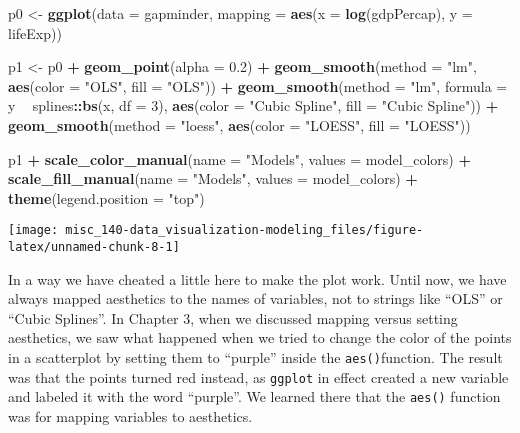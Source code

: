 \documentclass[]{book}
\newenvironment{Shaded}{\begin{snugshade}}{\end{snugshade}}
\newcommand{\DataTypeTok}[1]{\textcolor[rgb]{0.13,0.29,0.53}{#1}}
\newcommand{\DecValTok}[1]{\textcolor[rgb]{0.00,0.00,0.81}{#1}}
\newcommand{\FloatTok}[1]{\textcolor[rgb]{0.00,0.00,0.81}{#1}}
\newcommand{\KeywordTok}[1]{\textcolor[rgb]{0.13,0.29,0.53}{\textbf{#1}}}
\newcommand{\NormalTok}[1]{#1}
\newcommand{\OperatorTok}[1]{\textcolor[rgb]{0.81,0.36,0.00}{\textbf{#1}}}
\newcommand{\StringTok}[1]{\textcolor[rgb]{0.31,0.60,0.02}{#1}}
\begin{document}
\begin{Shaded}
\begin{Highlighting}[]
\NormalTok{p0 <-}\StringTok{ }\KeywordTok{ggplot}\NormalTok{(}\DataTypeTok{data =}\NormalTok{ gapminder,}
            \DataTypeTok{mapping =} \KeywordTok{aes}\NormalTok{(}\DataTypeTok{x =} \KeywordTok{log}\NormalTok{(gdpPercap), }\DataTypeTok{y =}\NormalTok{ lifeExp))}

\NormalTok{p1 <-}\StringTok{ }\NormalTok{p0 }\OperatorTok{+}\StringTok{ }\KeywordTok{geom_point}\NormalTok{(}\DataTypeTok{alpha =} \FloatTok{0.2}\NormalTok{) }\OperatorTok{+}
\StringTok{    }\KeywordTok{geom_smooth}\NormalTok{(}\DataTypeTok{method =} \StringTok{"lm"}\NormalTok{, }\KeywordTok{aes}\NormalTok{(}\DataTypeTok{color =} \StringTok{"OLS"}\NormalTok{, }\DataTypeTok{fill =} \StringTok{"OLS"}\NormalTok{)) }\OperatorTok{+}
\StringTok{    }\KeywordTok{geom_smooth}\NormalTok{(}\DataTypeTok{method =} \StringTok{"lm"}\NormalTok{, }\DataTypeTok{formula =}\NormalTok{ y }\OperatorTok{~}\StringTok{ }\NormalTok{splines}\OperatorTok{::}\KeywordTok{bs}\NormalTok{(x, }\DataTypeTok{df =} \DecValTok{3}\NormalTok{),}
                \KeywordTok{aes}\NormalTok{(}\DataTypeTok{color =} \StringTok{"Cubic Spline"}\NormalTok{, }\DataTypeTok{fill =} \StringTok{"Cubic Spline"}\NormalTok{)) }\OperatorTok{+}
\StringTok{    }\KeywordTok{geom_smooth}\NormalTok{(}\DataTypeTok{method =} \StringTok{"loess"}\NormalTok{,}
                \KeywordTok{aes}\NormalTok{(}\DataTypeTok{color =} \StringTok{"LOESS"}\NormalTok{, }\DataTypeTok{fill =} \StringTok{"LOESS"}\NormalTok{))}


\NormalTok{p1 }\OperatorTok{+}\StringTok{ }\KeywordTok{scale_color_manual}\NormalTok{(}\DataTypeTok{name =} \StringTok{"Models"}\NormalTok{, }\DataTypeTok{values =}\NormalTok{ model_colors) }\OperatorTok{+}
\StringTok{    }\KeywordTok{scale_fill_manual}\NormalTok{(}\DataTypeTok{name =} \StringTok{"Models"}\NormalTok{, }\DataTypeTok{values =}\NormalTok{ model_colors) }\OperatorTok{+}
\StringTok{    }\KeywordTok{theme}\NormalTok{(}\DataTypeTok{legend.position =} \StringTok{"top"}\NormalTok{)}
\end{Highlighting}
\end{Shaded}

\begin{center}\texttt{[image: misc\_140-data\_visualization-modeling\_files/figure-latex/unnamed-chunk-8-1]} \end{center}

In a way we have cheated a little here to make the plot work. Until now, we have always mapped aesthetics to the names of variables, not to strings like ``OLS'' or ``Cubic Splines''. In Chapter 3, when we discussed mapping versus setting aesthetics, we saw what happened when we tried to change the color of the points in a scatterplot by setting them to ``purple'' inside the \texttt{aes()}function. The result was that the points turned red instead, as \texttt{ggplot} in effect created a new variable and labeled it with the word ``purple''. We learned there that the \texttt{aes()} function was for mapping variables to aesthetics.
\end{document}

